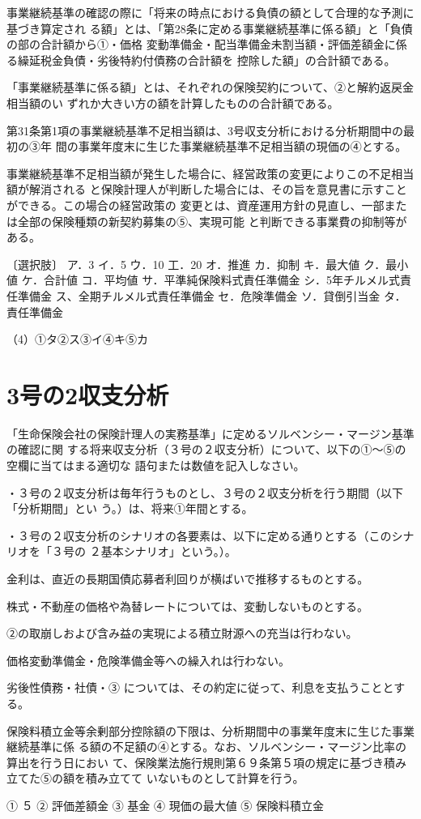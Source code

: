 \documentclass[report,gutter=10mm,fore-edge=10mm,uplatex,dvipdfmx]{jlreq}
\begin{document}
事業継続基準の確認の際に「将来の時点における負債の額として合理的な予測に基づき算定され
る額」とは、「第28条に定める事業継続基準に係る額」と「負債の部の合計額から①・価格
変動準備金・配当準備金未割当額・評価差額金に係る繰延税金負債・劣後特約付債務の合計額を
控除した額」の合計額である。

「事業継続基準に係る額」とは、それぞれの保険契約について、②と解約返戻金相当額のい
ずれか大きい方の額を計算したものの合計額である。

第31条第1項の事業継続基準不足相当額は、3号収支分析における分析期間中の最初の③年
間の事業年度末に生じた事業継続基準不足相当額の現価の④とする。

事業継続基準不足相当額が発生した場合に、経営政策の変更によりこの不足相当額が解消される
と保険計理人が判断した場合には、その旨を意見書に示すことができる。この場合の経営政策の
変更とは、資産運用方針の見直し、一部または全部の保険種類の新契約募集の⑤、実現可能
と判断できる事業費の抑制等がある。

〔選択肢〕
ア．3
イ．5
ウ．10
工．20
オ．推進
カ．抑制
キ．最大値
ク．最小値
ケ．合計値
コ．平均値
サ．平準純保険料式責任準備金
シ．5年チルメル式責任準備金
ス、全期チルメル式責任準備金
セ．危険準備金
ソ．貸倒引当金
タ．責任準備金

\answer{}
（4）①タ②ス③イ④キ⑤カ

\section{3号の2収支分析}
「生命保険会社の保険計理人の実務基準」に定めるソルベンシー・マージン基準の確認に関
する将来収支分析（３号の２収支分析）について、以下の①～⑤の空欄に当てはまる適切な
語句または数値を記入しなさい。

・３号の２収支分析は毎年行うものとし、３号の２収支分析を行う期間（以下「分析期間」とい
う。）は、将来①年間とする。

・３号の２収支分析のシナリオの各要素は、以下に定める通りとする（このシナリオを「３号の
２基本シナリオ」という。）。

 金利は、直近の長期国債応募者利回りが横ばいで推移するものとする。

 株式・不動産の価格や為替レートについては、変動しないものとする。

②の取崩しおよび含み益の実現による積立財源への充当は行わない。

 価格変動準備金・危険準備金等への繰入れは行わない。

 劣後性債務・社債・③
については、その約定に従って、利息を支払うこととする。

保険料積立金等余剰部分控除額の下限は、分析期間中の事業年度末に生じた事業継続基準に係
る額の不足額の④とする。なお、ソルベンシー・マージン比率の算出を行う日におい
て、保険業法施行規則第６９条第５項の規定に基づき積み立てた⑤の額を積み立てて
いないものとして計算を行う。

\answer{}
① ５ ② 評価差額金 
③ 基金 
④ 現価の最大値 ⑤ 保険料積立金 
\end{document}
